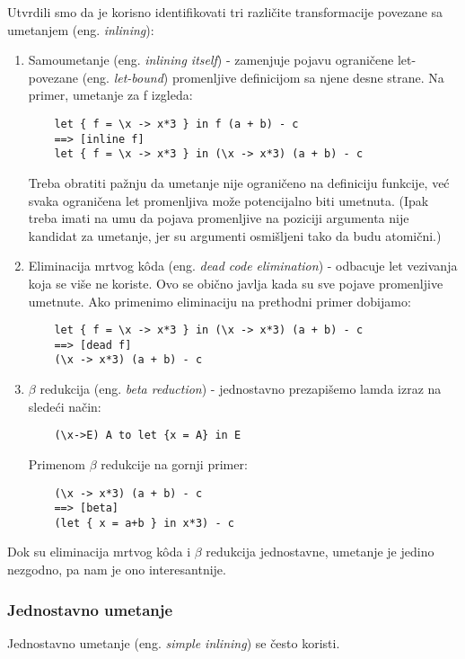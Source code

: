 Utvrdili smo da je korisno identifikovati tri različite transformacije povezane sa umetanjem (eng. \emph{inlining}):
\begin{enumerate}
	\item  Samoumetanje (eng. \emph{inlining itself}) - zamenjuje pojavu ograničene let-povezane (eng. \emph{let-bound}) promenljive definicijom sa njene desne strane. Na primer, umetanje za f izgleda: 
	\begin{verbatim}
	let { f = \x -> x*3 } in f (a + b) - c
	==> [inline f]
	let { f = \x -> x*3 } in (\x -> x*3) (a + b) - c
	\end{verbatim}
	Treba obratiti pažnju da umetanje nije ograničeno na definiciju funkcije, već svaka ograničena let promenljiva može potencijalno biti umetnuta. (Ipak treba imati na umu da pojava promenljive na poziciji argumenta nije kandidat za umetanje, jer su argumenti osmišljeni tako da budu atomični.)
	\item Eliminacija mrtvog k\^{o}da (eng. \emph{dead code elimination}) - odbacuje let vezivanja koja se više ne koriste. Ovo se obično javlja 
	kada su sve pojave promenljive umetnute. Ako primenimo eliminaciju na prethodni primer dobijamo:
	\begin{verbatim}
	let { f = \x -> x*3 } in (\x -> x*3) (a + b) - c
	==> [dead f]
	(\x -> x*3) (a + b) - c
	\end{verbatim}
	\item $\beta$  redukcija (eng. \emph{beta reduction}) - jednostavno prezapišemo lamda izraz na sledeći način:
	\begin{verbatim}
	(\x->E) A to let {x = A} in E 
	\end{verbatim} Primenom $\beta$ redukcije na gornji primer:
	\begin{verbatim}
	(\x -> x*3) (a + b) - c
	==> [beta]
	(let { x = a+b } in x*3) - c
	\end{verbatim}
\end{enumerate}

Dok su eliminacija mrtvog k\^{o}da i $\beta$ redukcija jednostavne, umetanje je jedino nezgodno, pa nam je ono interesantnije.

\subsubsection{Jednostavno umetanje}
\label{sec:podpodnaslovSimpleInline}

Jednostavno umetanje (eng. \emph{simple inlining}) se često koristi. 


